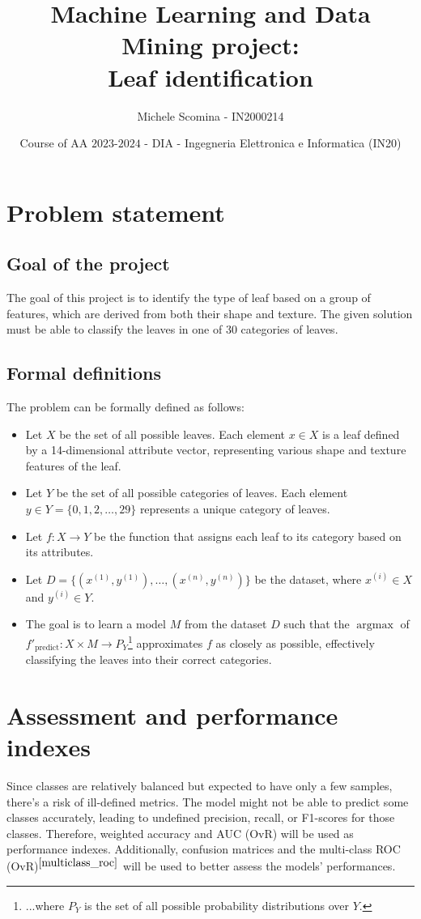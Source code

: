 \documentclass{article}
\title{Machine Learning and Data Mining project:\\Leaf identification}
\author[1]{Michele Scomina - IN2000214}
\date{Course of AA $2023$-$2024$ - DIA - Ingegneria Elettronica e Informatica (IN20)}
\begin{document}
\maketitle



\section{Problem statement}
\subsection{Goal of the project}
The goal of this project is to identify the type of leaf based on a group of features, which are derived from both their shape and texture.
The given solution must be able to classify the leaves in one of 30 categories of leaves.

\subsection{Formal definitions}
The problem can be formally defined as follows:
\begin{itemize}
    \item Let $X$ be the set of all possible leaves. Each element $x \in X$ is a leaf defined by a 14-dimensional attribute vector, representing various shape and texture features of the leaf.
    \item Let $Y$ be the set of all possible categories of leaves. Each element $y \in Y = \{0, 1, 2, \ldots, 29\}$ represents a unique category of leaves.
    \item Let $f: X \to Y$ be the function that assigns each leaf to its category based on its attributes.
    \item Let $D = \{(x^{(1)}, y^{(1)}), \ldots, (x^{(n)}, y^{(n)})\}$ be the dataset, where $x^{(i)} \in X$ and $y^{(i)} \in Y$.
    \item The goal is to learn a model $M$ from the dataset $D$ such that the $\operatorname{argmax}$ of $f'_{\text{predict}}: X \times M \to P_{Y}$\footnote{...where $P_{Y}$ is the set of all possible probability distributions over $Y$.} approximates $f$ as closely as possible, effectively classifying the leaves into their correct categories.
\end{itemize}


\section{Assessment and performance indexes}
Since classes are relatively balanced but expected to have only a few samples, there's a risk of ill-defined metrics. 
The model might not be able to predict some classes accurately, leading to undefined precision, recall, or F1-scores for those classes.
Therefore, weighted accuracy and AUC (OvR) will be used as performance indexes.
Additionally, confusion matrices and the multi-class ROC (OvR)$^{\cite{multiclass_roc}}$ will be used to better assess the models' performances.
\end{document}
